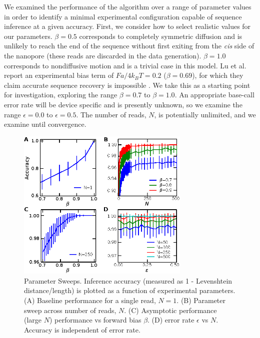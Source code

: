 \documentclass{biophys_letter}
\newcommand{\bias}{\beta}
\newcommand{\err}{\epsilon}
\begin{document}
We examined the performance of the algorithm over a range of parameter values in order to identify a minimal experimental configuration capable of sequence inference at a given accuracy.
First, we consider how to select realistic values for our parameters.
$\bias=0.5$ corresponds to completely symmetric diffusion and is unlikely to reach the end of the sequence without first exiting from the {\it cis} side of the nanopore (these reads are discarded in the data generation).
$\bias=1.0$ corresponds to nondiffusive motion and is a trivial case in this model.
Lu et al. report an experimental bias term of $Fa/4k_{B}T=0.2$ ($\bias=0.69$), for which they claim accurate sequence recovery is impossible \cite{Lu:2011}.
We take this as a starting point for investigation, exploring the range $\bias=0.7$ to $\bias=1.0$.
An appropriate base-call error rate will be device specific and is presently unknown, so we examine the range $\err=0.0$ to $\err=0.5$.
The number of reads, $N$, is potentially unlimited, and we examine until convergence.

\begin{figure}
  \centering
  \includegraphics[width=3.25in]{fig/stochseq-fig3.eps}  
  \caption{Parameter Sweeps. Inference accuracy (measured as 1 - Levenshtein distance/length) is plotted as a function of experimental parameters. (A) Baseline performance for a single read, $N=1$. (B) Parameter sweep across number of reads, $N$. (C) Asymptotic performance (large $N$) performance vs forward bias $\bias$. (D) error rate $\err$ vs $N$. Accuracy is independent of error rate.}
  \label{fig:parameter_sweeps}
\end{figure}
\end{document}
